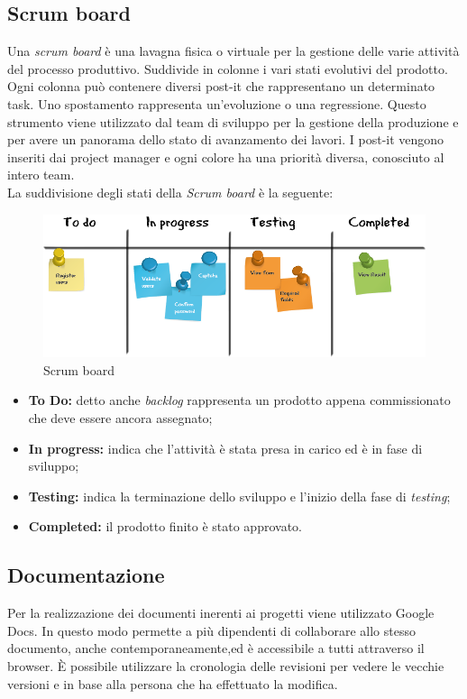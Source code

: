 \subsection*{Scrum board}
Una \textit{scrum board }è una lavagna fisica o virtuale per la gestione delle varie attività del processo produttivo. Suddivide in colonne i vari stati evolutivi del prodotto. Ogni colonna può contenere diversi post-it che rappresentano un determinato task. Uno spostamento rappresenta un'evoluzione o una regressione. Questo strumento viene utilizzato dal team di sviluppo per la gestione della produzione e per avere un panorama dello stato di avanzamento dei lavori. I post-it vengono inseriti dai project manager e ogni colore ha una priorità diversa, conosciuto al intero team. \\
La suddivisione degli stati della \textit{Scrum board }è la seguente:

\begin{figure}[h]
\centering
\includegraphics[width=0.9\linewidth]{immagini/scrum-board}
\caption[Scrum board]{Scrum board}
\label{fig:scrum-board}
\end{figure}

\begin{itemize}
	\item \textbf{To Do: }detto anche \textit{backlog }rappresenta un prodotto appena commissionato che deve essere ancora assegnato;
	\item \textbf{In progress: }indica che l'attività è stata presa in carico ed è in fase di sviluppo;
	\item \textbf{Testing: }indica la terminazione dello sviluppo e l'inizio della fase di \textit{testing};
	\item \textbf{Completed: }il prodotto finito è stato approvato.
\end{itemize}

\subsection*{Documentazione}
Per la realizzazione dei documenti inerenti ai progetti viene utilizzato Google Docs. In questo modo permette a più dipendenti di collaborare allo stesso documento, anche contemporaneamente,ed è accessibile a tutti attraverso il browser. È possibile utilizzare la cronologia delle revisioni per vedere le vecchie versioni e in base alla persona che ha effettuato la modifica.

